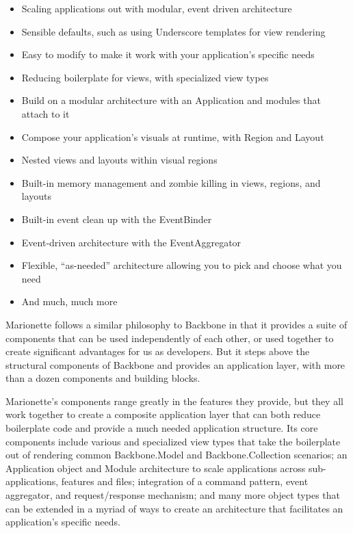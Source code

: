 \documentclass[9pt]{book}
\begin{document}
\begin{itemize}
\itemsep1pt\parskip0pt
\item
  Scaling applications out with modular, event driven architecture
\item
  Sensible defaults, such as using Underscore templates for view
  rendering
\item
  Easy to modify to make it work with your application's specific needs
\item
  Reducing boilerplate for views, with specialized view types
\item
  Build on a modular architecture with an Application and modules that
  attach to it
\item
  Compose your application's visuals at runtime, with Region and Layout
\item
  Nested views and layouts within visual regions
\item
  Built-in memory management and zombie killing in views, regions, and
  layouts
\item
  Built-in event clean up with the EventBinder
\item
  Event-driven architecture with the EventAggregator
\item
  Flexible, ``as-needed'' architecture allowing you to pick and choose
  what you need
\item
  And much, much more
\end{itemize}

Marionette follows a similar philosophy to Backbone in that it provides
a suite of components that can be used independently of each other, or
used together to create significant advantages for us as developers. But
it steps above the structural components of Backbone and provides an
application layer, with more than a dozen components and building
blocks.

Marionette's components range greatly in the features they provide, but
they all work together to create a composite application layer that can
both reduce boilerplate code and provide a much needed application
structure. Its core components include various and specialized view
types that take the boilerplate out of rendering common Backbone.Model
and Backbone.Collection scenarios; an Application object and Module
architecture to scale applications across sub-applications, features and
files; integration of a command pattern, event aggregator, and
request/response mechanism; and many more object types that can be
extended in a myriad of ways to create an architecture that facilitates
an application's specific needs.
\end{document}
